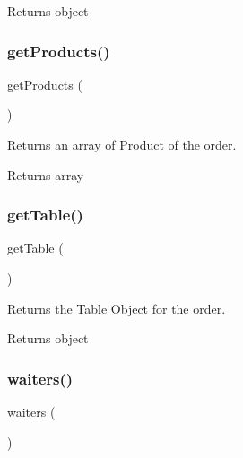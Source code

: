 \begin{DoxyReturn}{Returns}
object 
\end{DoxyReturn}
\mbox{\label{class_app_1_1_models_1_1_order_a9686a480a1adb1923d64e71cf0624275}} 
\subsubsection{\texorpdfstring{get\+Products()}{getProducts()}}
{\footnotesize\ttfamily get\+Products (\begin{DoxyParamCaption}{ }\end{DoxyParamCaption})}

Returns an array of Product of the order.

\begin{DoxyReturn}{Returns}
array 
\end{DoxyReturn}
\mbox{\label{class_app_1_1_models_1_1_order_aa0dd4bf57d57bc2a3697e40c9f6bddce}} 
\subsubsection{\texorpdfstring{get\+Table()}{getTable()}}
{\footnotesize\ttfamily get\+Table (\begin{DoxyParamCaption}{ }\end{DoxyParamCaption})}

Returns the \mbox{\hyperlink{class_app_1_1_models_1_1_table}{Table}} Object for the order.

\begin{DoxyReturn}{Returns}
object 
\end{DoxyReturn}
\mbox{\label{class_app_1_1_models_1_1_order_aa314a2ddd62ccb42f5a3f80ee8c316e1}} 
\subsubsection{\texorpdfstring{waiters()}{waiters()}}
{\footnotesize\ttfamily waiters (\begin{DoxyParamCaption}{ }\end{DoxyParamCaption})}


